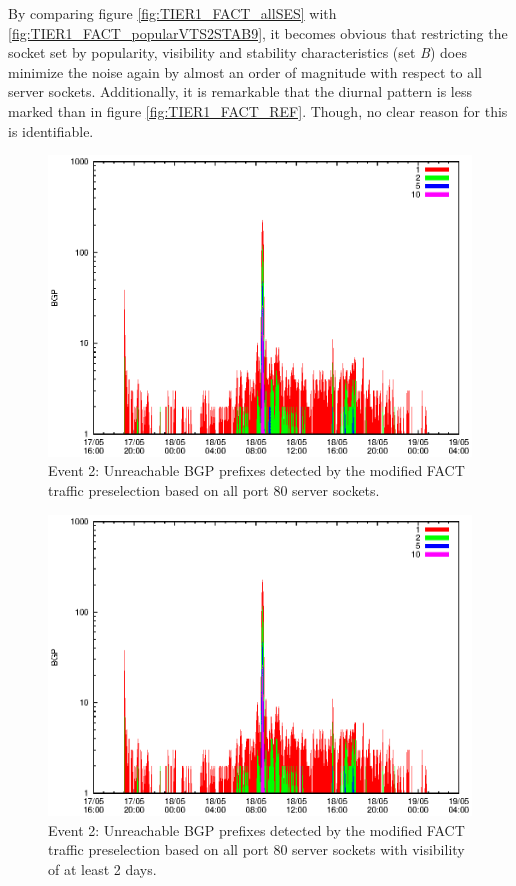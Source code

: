 By comparing figure \ref{fig:TIER1_FACT_allSES} with \ref{fig:TIER1_FACT_popularVTS2STAB9}, it becomes obvious that restricting the socket set by popularity, visibility and stability characteristics (set \emph{B}) does minimize the noise again by almost an order of magnitude with respect to all server sockets. Additionally, it is remarkable that the diurnal pattern is less marked than in figure \ref{fig:TIER1_FACT_REF}. Though, no clear reason for this is identifiable. 
\begin{figure}
	[p] \centering 
	\includegraphics[width=0.75\linewidth]{images/events/2010_05_18/bgp_log_allPort80SES.eps} \caption{Event 2: Unreachable BGP prefixes detected by the modified FACT traffic preselection based on all port 80 server sockets.} 
	\label{fig:TIER1_FACT_allSES80} 
\end{figure}
\begin{figure}
	[p] \centering 
	\includegraphics[width=0.75\linewidth]{images/events/2010_05_18/bgp_log_port80_Set_stab_0_vts_2.eps} \caption{Event 2: Unreachable BGP prefixes detected by the modified FACT traffic preselection based on all port 80 server sockets with visibility of at least 2 days.} 
	\label{fig:TIER1_FACT_allSES80VTS2} 
\end{figure}
